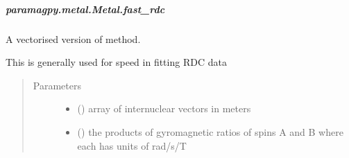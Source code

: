 \documentclass[a4paper,10pt,english,openany,oneside]{sphinxmanual}
\begin{document}
\begin{fulllineitems}
\begin{fulllineitems}
\begin{fulllineitems}
\end{fulllineitems}



\subparagraph{paramagpy.metal.Metal.fast\_rdc}
\label{\detokenize{reference/generated/paramagpy.metal.Metal.fast_rdc:paramagpy-metal-metal-fast-rdc}}\label{\detokenize{reference/generated/paramagpy.metal.Metal.fast_rdc::doc}}

\begin{fulllineitems}
\label{\detokenize{reference/generated/paramagpy.metal.Metal.fast_rdc:paramagpy.metal.Metal.fast_rdc}}
\sphinxAtStartPar
A vectorised version of {\hyperref[\detokenize{reference/generated/paramagpy.metal.Metal.rdc:paramagpy.metal.Metal.rdc}]{}} method.

\sphinxAtStartPar
This is generally used for speed in fitting RDC data
\begin{quote}\begin{description}
\item[{Parameters}] \leavevmode\begin{itemize}
\item {} 
\sphinxAtStartPar
{} (\sphinxstyleliteralemphasis{\sphinxupquote{ (}}\sphinxstyleliteralemphasis{\sphinxupquote{,}}\sphinxstyleliteralemphasis{\sphinxupquote{)}}) \textendash{} array of internuclear vectors in meters

\item {} 
\sphinxAtStartPar
{} (\sphinxstyleliteralemphasis{\sphinxupquote{ (}}\sphinxstyleliteralemphasis{\sphinxupquote{,}}\sphinxstyleliteralemphasis{\sphinxupquote{)}}) \textendash{} the products of gyromagnetic ratios of spins A and B
where each has units of rad/s/T

\end{itemize}


\end{description}
\end{quote}
\end{fulllineitems}
\end{fulllineitems}
\end{fulllineitems}
\end{document}
